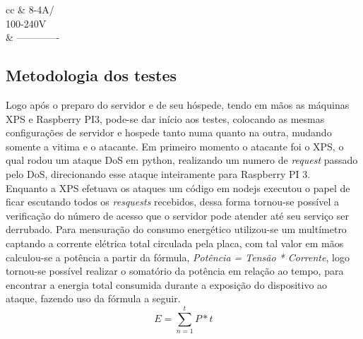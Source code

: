 \documentclass[12pt]{article}
\begin{document}
\begin{table}[!h]
\begin{tabular}{cc}
     & 8-4A/\\100-240V                                                                               \\ \hline
                                                        & -------------                                                                               \\ \hline
    \end{tabular}
    \end{table}

  \subsection{Metodologia dos testes} \label{sec:testes}
    Logo após o preparo do servidor e de seu hóspede, tendo em mãos as máquinas XPS e Raspberry PI3, pode-se dar início aos testes, colocando as mesmas configurações de servidor e hospede tanto numa quanto na outra, mudando somente a vitima e o atacante. Em primeiro momento o atacante foi o XPS, o qual rodou um ataque DoS em python, realizando um numero de \textit{request} passado pelo DoS, direcionando esse ataque inteiramente para Raspberry PI 3.\\
    Enquanto a XPS efetuava os ataques um código em nodejs executou o papel de ficar escutando todos os \textit{resquests} recebidos, dessa forma tornou-se possível a verificação do número de acesso que o servidor pode atender até seu serviço ser derrubado. Para mensuração do consumo energético utilizou-se um multímetro captando a corrente elétrica total circulada pela placa, com tal valor em mãos calculou-se a potência a partir da fórmula, \textit{Potência = Tensão * Corrente}, logo tornou-se possível realizar o somatório da potência em relação ao tempo, para encontrar a energia total consumida durante a exposição do dispositivo ao ataque, fazendo uso da fórmula a seguir. $$E = \sum_{n=1}^{t} P*t$$ \\
\end{document}
